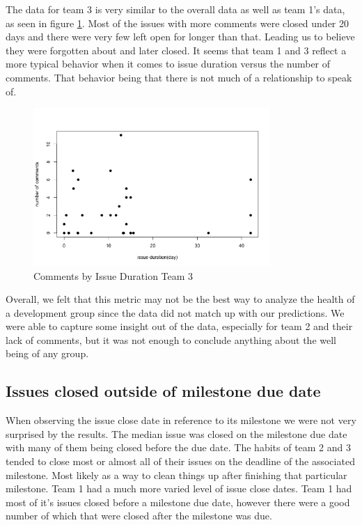 \documentclass[conference]{IEEEtran}
\begin{document}
The data for team 3 is very similar to the overall data as well as team 1's data, as seen in figure \ref{comments_duration_3}. Most of the issues with more comments were closed under 20 days and there were very few left open for longer than that. Leading us to believe they were forgotten about and later closed. It seems that team 1 and 3 reflect a more typical behavior when it comes to issue duration versus the number of comments. That behavior being that there is not much of a relationship to speak of. 

\begin{figure}[H]
    \centering
    \includegraphics[width=9cm]{../AprilProject/pic/comments_and_issue_duration3.png}
    \caption{Comments by Issue Duration Team 3}
    \label{comments_duration_3}
\end{figure}

Overall, we felt that this metric may not be the best way to analyze the health of a development group since the data did not match up with our predictions. We were able to capture some insight out of the data, especially for team 2 and their lack of comments, but it was not enough to conclude anything about the well being of any group. 


\subsection{Issues closed outside of milestone due date}
When observing the issue close date in reference to its milestone we were not very surprised by the results. The median issue was closed on the milestone due date with many of them being closed before the due date. The habits of team 2 and 3 tended to close most or almost all of their issues on the deadline of the associated milestone. Most likely as a way to clean things up after finishing that particular milestone. Team 1 had a much more varied level of issue close dates. Team 1 had most of it's issues closed before a milestone due date, however there were a good number of which that were closed after the milestone was due. 
\end{document}
